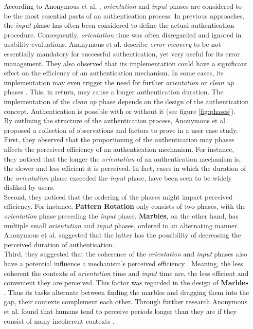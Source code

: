 According to Anonymous et al. \cite{anonymous}, \textit{orientation} and \textit{input} phases are considered to be the most essential parts of an authentication process. In previous approaches, the \textit{input} phase has often been considered to define the actual authentication procedure. Consequently, \textit{orientation} time was often disregarded and ignored in usability evaluations. Ananymous et al. \cite{anonymous} describe \textit{error recovery} to be not essentially mandatory for successful authentication, yet very useful for its error management. They also observed that its implementation could have a significant effect on the efficiency of an authentication mechanism. In some cases, its implementation may even trigger the need for further \textit{orientation} or \textit{clean up} phases \cite{anonymous}. This, in return, may cause a longer authentication duration. The implementation of the \textit{clean up} phase depends on the design of the authentication concept. Authentication is possible with or without it (see figure \ref{fig:phases}). \\

By outlining the structure of the authentication process, Anonymous et al. \cite{anonymous} proposed a collection of observations and factors to prove in a user case study. First, they observed that the proportioning of the authentication may phases affects the perceived efficiency of an authentication mechanism. For instance, they noticed that the longer the \textit{orientation} of an authentication mechanism is, the slower and less efficient it is perceived. In fact, cases in which the duration of the \textit{orientation} phase exceeded the \textit{input} phase, have been seen to be widely disliked by users. \\

Second, they noticed that the ordering of the phases might impact perceived efficiency. For instance, \textbf{Pattern Rotation} only consists of two phases, with the \textit{orientation} phase preceding the \textit{input} phase. \textbf{Marbles}, on the other hand, has multiple small \textit{orientation} and \textit{input} phases, ordered in an alternating manner. Anonymous et al. \cite{anonymous} suggested that the latter has the possibility of decreasing the perceived duration of authentication. \\

Third, they suggested that the coherence of the \textit{orientation} and \textit{input} phases also have a potential influence a mechanism's perceived efficiency \cite{anonymous}. Meaning, the less coherent the contexts of \textit{orientation} time and \textit{input} time are, the less efficient and convenient they are perceived. This factor was regarded in the design of \textbf{Marbles} \cite{Marbles}. Thus its tasks alternate between finding the marbles and dragging them into the gap, their contexts complement each other. Through further research Anonymous et al. \cite{anonymous} found that humans tend to perceive periods longer than they are if they consist of many incoherent contexts \cite{anonymous,perception}.\\

